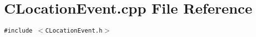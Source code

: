 \section{CLocation\-Event.cpp File Reference}
\label{CLocationEvent_8cpp}
{\tt \#include $<$CLocation\-Event.h$>$}\par
